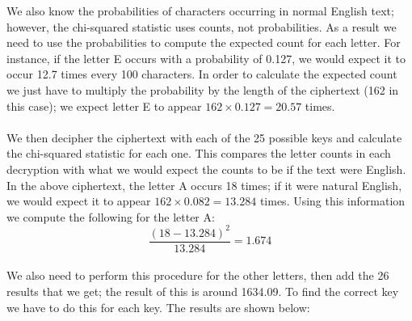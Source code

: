 \documentclass[Lau,binding=0.6cm,oneside]{sapthesis}
\begin{document}
We also know the probabilities of characters occurring in normal English text; however, the chi-squared statistic uses counts, not probabilities. As a result we need to use the probabilities to compute the expected count for each letter. For instance, if the letter E occurs with a probability of 0.127, we would expect it to occur 12.7 times every 100 characters. In order to calculate the expected count we just have to multiply the probability by the length of the ciphertext (162 in this case); we expect letter E to appear $ 162 \times 0.127 = 20.57$ times.\\\\

We then decipher the ciphertext with each of the 25 possible keys and calculate the chi-squared statistic for each one. This compares the letter counts in each decryption with what we would expect the counts to be if the text were English. In the above ciphertext, the letter A occurs 18 times; if it were natural English, we would expect it to appear $162 \times 0.082 = 13.284$ times. Using this information we compute the following for the letter A:\\

\begin{equation}
\frac{(18-13.284)^{2}}{13.284} = 1.674
\end{equation}
\ \\
We also need to perform this procedure for the other letters, then add the 26 results that we get; the result of this is around 1634.09. To find the correct key we have to do this for each key. The results are shown below:\\
\end{document}

